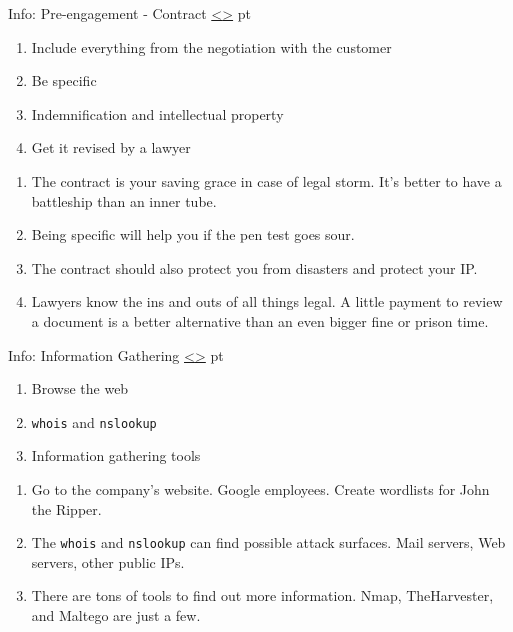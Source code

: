 \documentclass[12pt]{extarticle}
\newenvironment{instructionblock}{\Large\bgroup}{\egroup}
\newcounter{next}
\newcounter{prev}
\begin{document}
\pagebreak
{}
\begin{slide}{Info: Pre-engagement - Contract}
{\hyperref[slide \theprev]{\textless}\hyperref[slide \thenext]{\textgreater}}
	 pt
	\begin{instructionblock}
		\begin{enumerate}
            \item Include everything from the negotiation with the customer
            \item Be specific
            \item Indemnification and intellectual property
            \item Get it revised by a lawyer
		\end{enumerate}
	\end{instructionblock}
\end{slide}
\begin{enumerate}
\item The contract is your saving grace in case of legal storm. \cite[Chapter 0]{Ref:Weidman} It's better to have a battleship than an inner tube.
\item Being specific will help you if the pen test goes sour. \cite{Ref:Legal1}
\item The contract should also protect you from disasters and protect your IP. \cite{Ref:Legal1}
\item Lawyers know the ins and outs of all things legal. A little payment to review a document is a better alternative than an even bigger fine or prison time.
\end{enumerate}

\pagebreak
{}
\begin{slide}{Info: Information Gathering}
{\hyperref[slide \theprev]{\textless}\hyperref[slide \thenext]{\textgreater}}
	 pt
	\begin{instructionblock}
		\begin{enumerate}
            \item Browse the web
            \item \texttt{whois} and \texttt{nslookup}
            \item Information gathering tools
		\end{enumerate}
	\end{instructionblock}
\end{slide}
\begin{enumerate}
\item Go to the company's website. Google employees. Create wordlists for John the Ripper. \cite[Chapter 5]{Ref:Weidman}
\item The \texttt{whois} and \texttt{nslookup} can find possible attack surfaces. Mail servers, Web servers, other public IPs. \cite[Chapter 5]{Ref:Weidman}
\item There are tons of tools to find out more information. Nmap, TheHarvester, and Maltego are just a few. \cite[Chapter 5]{Ref:Weidman}
\end{enumerate}
\end{document}
